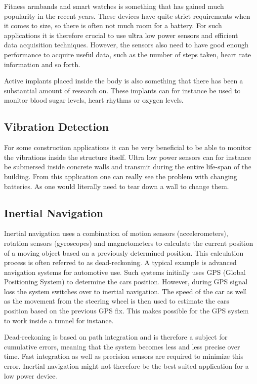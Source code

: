 Fitness armbands and smart watches is something that has gained much popularity in the recent years. These devices have quite strict requirements when it comes to size, so there is often not much room for a battery. For such applications it is therefore crucial to use ultra low power sensors and efficient data acquisition techniques. However, the sensors also need to have good enough performance to acquire useful data, such as the number of steps taken, heart rate information and so forth.  

Active implants placed inside the body is also something that there has been a substantial amount of research on. These implants can for instance be used to monitor blood sugar levels, heart rhythms or oxygen levels. 

\subsection{Vibration Detection}

For some construction applications it can be very beneficial to be able to monitor the vibrations inside the structure itself. Ultra low power sensors can for instance be submersed inside concrete walls and transmit during the entire life-span of the building. From this application one can really see the problem with changing batteries. As one would literally need to tear down a wall to change them. 

\subsection{Inertial Navigation}

Inertial navigation uses a combination of motion sensors (accelerometers), rotation sensors (gyroscopes) and magnetometers to calculate the current position of a moving object based on a previously determined position. This calculation process is often referred to as dead-reckoning. A typical example is advanced navigation systems for automotive use. Such systems initially uses GPS (Global Positioning System) to determine the cars position. However, during GPS signal loss the system switches over to inertial navigation. The speed of the car as well as the movement from the steering wheel is then used to estimate the cars position based on the previous GPS fix. This makes possible for the GPS system to work inside a tunnel for instance. 

Dead-reckoning is based on path integration and is therefore a subject for cumulative errors, meaning that the system becomes less and less precise over time. Fast integration as well as precision sensors are required to minimize this error. Inertial navigation might not therefore be the best suited application for a low power device. 